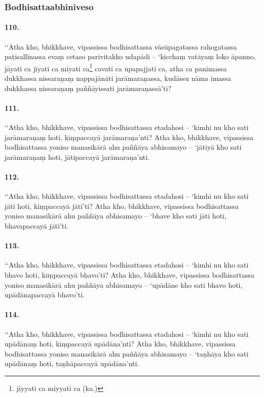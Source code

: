 \subsubsection{Bodhisattaabhiniveso}

\paragraph{110.} ‘‘Atha kho, bhikkhave, vipassissa bodhisattassa vāsūpagatassa rahogatassa paṭisallīnassa evaṃ cetaso parivitakko udapādi – ‘kicchaṃ vatāyaṃ loko āpanno, jāyati ca jīyati ca mīyati ca\footnote{jiyyati ca miyyati ca (ka.)} cavati ca upapajjati ca, atha ca panimassa dukkhassa nissaraṇaṃ nappajānāti jarāmaraṇassa, kudāssu nāma imassa dukkhassa nissaraṇaṃ paññāyissati jarāmaraṇassā’ti?

\paragraph{111.} ‘‘Atha kho, bhikkhave, vipassissa bodhisattassa etadahosi – ‘kimhi nu kho sati jarāmaraṇaṃ hoti, kiṃpaccayā jarāmaraṇa’nti? Atha kho, bhikkhave, vipassissa bodhisattassa yoniso manasikārā ahu paññāya abhisamayo – ‘jātiyā kho sati jarāmaraṇaṃ hoti, jātipaccayā jarāmaraṇa’nti.

\paragraph{112.} ‘‘Atha kho, bhikkhave, vipassissa bodhisattassa etadahosi – ‘kimhi nu kho sati jāti hoti, kiṃpaccayā jātī’ti? Atha kho, bhikkhave, vipassissa bodhisattassa yoniso manasikārā ahu paññāya abhisamayo – ‘bhave kho sati jāti hoti, bhavapaccayā jātī’ti.

\paragraph{113.} ‘‘Atha kho, bhikkhave, vipassissa bodhisattassa etadahosi – ‘kimhi nu kho sati bhavo hoti, kiṃpaccayā bhavo’ti? Atha kho, bhikkhave, vipassissa bodhisattassa yoniso manasikārā ahu paññāya abhisamayo – ‘upādāne kho sati bhavo hoti, upādānapaccayā bhavo’ti.

\paragraph{114.} ‘‘Atha kho, bhikkhave, vipassissa bodhisattassa etadahosi – ‘kimhi nu kho sati upādānaṃ hoti, kiṃpaccayā upādāna’nti? Atha kho, bhikkhave, vipassissa bodhisattassa yoniso manasikārā ahu paññāya abhisamayo – ‘taṇhāya kho sati upādānaṃ hoti, taṇhāpaccayā upādāna’nti.

